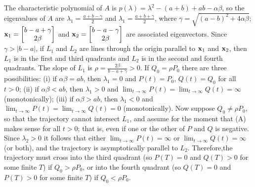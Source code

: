 \documentclass{ximera}
\begin{document}
\begin{problem}
\begin{solution}
    The characteristic polynomial of $A$ is
$p(\lambda)=\lambda^2-(a+b)+ab-\alpha\beta$, so the eigenvalues of $A$
are $\lambda_1=\frac{a+b-\gamma}{2}$ and
$\lambda_1=\frac{a+b+\gamma}{2}$, where
$\gamma=\sqrt{(a-b)^2+4\alpha\beta}$; ${\bf
x}_1=\begin{bmatrix}b-a+\gamma\\2\beta\end{bmatrix}$ and ${\bf
x}_2=\begin{bmatrix}b-a-\gamma\\2\beta\end{bmatrix}$ are associated eigenvectors. Since
$\gamma>|b-a|$, if $L_1$ and $L_2$ are lines through the origin
parallel to ${\bf x}_1$ and ${\bf x}_2$, then $L_1$ is in the first and
third quadrants and $L_2$ is in the second and fourth quadrants. The
slope of $L_1$ is $\rho=\frac{2\beta}{ b-a+\gamma}>0$. If $Q_0=\rho
P_0$ there are three possibilities: (i) if $\alpha\beta=ab$, then
$\lambda_1=0$ and $P(t)=P_0$, $Q(t)=Q_0$ for all $t>0$; (ii) if
$\alpha\beta<ab$, then $\lambda_1>0$ and
$\lim_{t\to\infty}P(t)=\lim_{t\to\infty}Q(t)=\infty$ (monotonically);
(iii) if $\alpha\beta>ab$, then $\lambda_1<0$ and
$\lim_{t\to\infty}P(t)=\lim_{t\to\infty}Q(t)=0$ (monotonically). Now
suppose $Q_0\ne\rho P_0$, so that the trajectory cannot intersect
$L_1$, and assume for the moment that (A) makes sense for all $t>0$;
that is, even if one or the other of $P$ and $Q$ is negative. Since
$\lambda_2>0$ it follows that either $\lim_{t\to\infty}P(t)=\infty$ or
$\lim_{t\to\infty}Q(t)=\infty$ (or both), and the trajectory is
asymptotically parallel to $L_2$. Therefore,the trajectory must cross
into the third quadrant (so $P(T)=0$ and $Q(T)>0$ for some finite $T$)
if $Q_0>\rho P_0$, or into the fourth quadrant (so $Q(T)=0$ and
$P(T)>0$ for some finite $T$) if $Q_0<\rho P_0$.

\end{solution}
\end{problem}
\end{document}
